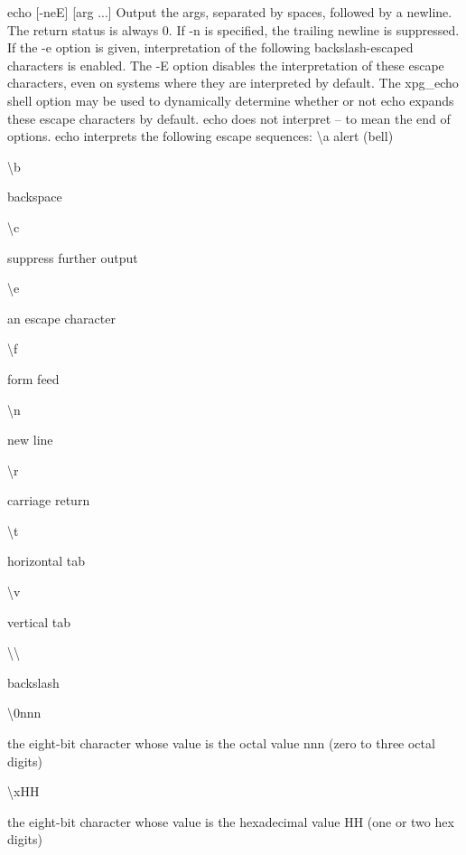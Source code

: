 echo [-neE] [arg ...]
Output the args, separated by spaces, followed by a newline. The return status is always 0. If -n is specified, the trailing newline is suppressed. If the -e option is given, interpretation of the following backslash-escaped characters is enabled. The -E option disables the interpretation of these escape characters, even on systems where they are interpreted by default. The xpg\_echo shell option may be used to dynamically determine whether or not echo expands these escape characters by default. echo does not interpret -- to mean the end of options. echo interprets the following escape sequences:
\textbackslash a
alert (bell)

\textbackslash b

backspace

\textbackslash c

suppress further output

\textbackslash e

an escape character

\textbackslash f

form feed

\textbackslash n

new line

\textbackslash r

carriage return

\textbackslash t

horizontal tab

\textbackslash v

vertical tab

\textbackslash \textbackslash 

backslash

\textbackslash 0nnn

the eight-bit character whose value is the octal value nnn (zero to three octal digits)

\textbackslash xHH

the eight-bit character whose value is the hexadecimal value HH (one or two hex digits)

